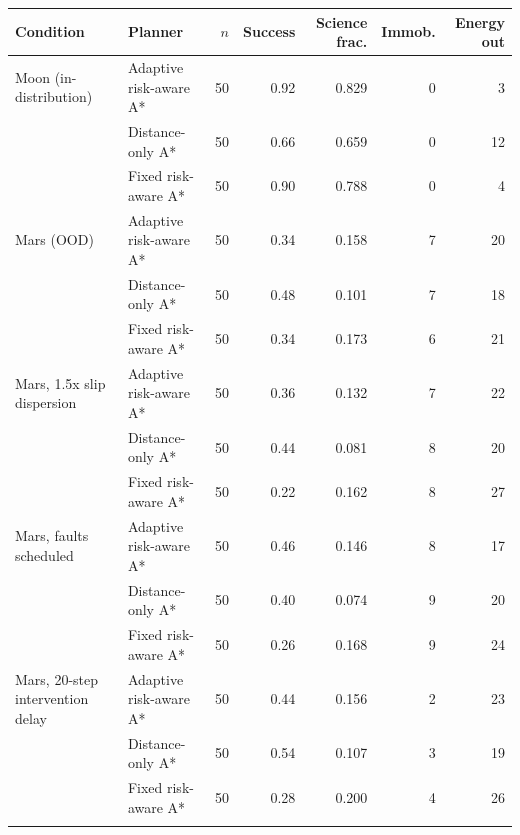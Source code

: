 \begin{tabular}{@{}llrrrrr@{}}
\toprule
Condition & Planner & $n$ & Success & Science frac. & Immob. & Energy out \\
\midrule
Moon (in-distribution) & Adaptive risk-aware A* & 50 & 0.92 & 0.829 & 0 & 3 \\
 & Distance-only A* & 50 & 0.66 & 0.659 & 0 & 12 \\
 & Fixed risk-aware A* & 50 & 0.90 & 0.788 & 0 & 4 \\
\addlinespace
Mars (OOD) & Adaptive risk-aware A* & 50 & 0.34 & 0.158 & 7 & 20 \\
 & Distance-only A* & 50 & 0.48 & 0.101 & 7 & 18 \\
 & Fixed risk-aware A* & 50 & 0.34 & 0.173 & 6 & 21 \\
\addlinespace
Mars, 1.5x slip dispersion & Adaptive risk-aware A* & 50 & 0.36 & 0.132 & 7 & 22 \\
 & Distance-only A* & 50 & 0.44 & 0.081 & 8 & 20 \\
 & Fixed risk-aware A* & 50 & 0.22 & 0.162 & 8 & 27 \\
\addlinespace
Mars, faults scheduled & Adaptive risk-aware A* & 50 & 0.46 & 0.146 & 8 & 17 \\
 & Distance-only A* & 50 & 0.40 & 0.074 & 9 & 20 \\
 & Fixed risk-aware A* & 50 & 0.26 & 0.168 & 9 & 24 \\
\addlinespace
Mars, 20-step intervention delay & Adaptive risk-aware A* & 50 & 0.44 & 0.156 & 2 & 23 \\
 & Distance-only A* & 50 & 0.54 & 0.107 & 3 & 19 \\
 & Fixed risk-aware A* & 50 & 0.28 & 0.200 & 4 & 26 \\
\addlinespace
\bottomrule
\end{tabular}
